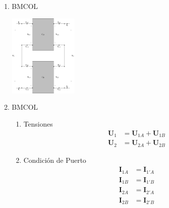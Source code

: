 \begin{enumerate}
\item \hfill{}\textsc{BMCOL}
\label{sec:orgfbc403e}

\includegraphics[height=4cm]{../figs/serie-serie.pdf}




\item \hfill{}\textsc{BMCOL}
\label{sec:orgb817874}
\begin{enumerate}
\item Tensiones
\label{sec:orgbdd8729}
\begin{align*}
  \mathbf{U}_1 &= \mathbf{U}_{1A} + \mathbf{U}_{1B}\\
  \mathbf{U}_2 &= \mathbf{U}_{2A} + \mathbf{U}_{2B}
\end{align*}

\item Condición de Puerto
\label{sec:org70529d0}
\begin{align*}
  \mathbf{I}_{1A} &= \mathbf{I}_{1'A}\\
  \mathbf{I}_{1B} &= \mathbf{I}_{1'B}\\
  \mathbf{I}_{2A} &= \mathbf{I}_{2'A}\\
  \mathbf{I}_{2B} &= \mathbf{I}_{2'B}
\end{align*}
\end{enumerate}
\end{enumerate}


